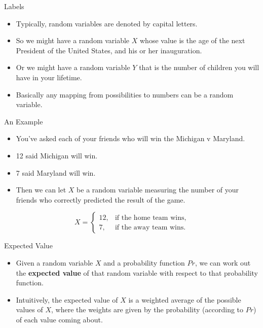 \documentclass[
  ignorenonframetext,
]{beamer}
\providecommand{\tightlist}{%
  \setlength{\itemsep}{0pt}\setlength{\parskip}{0pt}}
\renewcommand{\,}{\text{, }}
\begin{document}
\begin{frame}{Labels}
\protect\hypertarget{labels}{}

\begin{itemize}
\tightlist
\item
  Typically, random variables are denoted by capital letters.
\item
  So we might have a random variable \(X\) whose value is the age of the
  next President of the United States, and his or her inauguration.
\item
  Or we might have a random variable \(Y\) that is the number of
  children you will have in your lifetime.
\item
  Basically any mapping from possibilities to numbers can be a random
  variable.
\end{itemize}

\end{frame}

\begin{frame}{An Example}
\protect\hypertarget{an-example-1}{}

\begin{itemize}
\tightlist
\item
  You've asked each of your friends who will win the Michigan v
  Maryland.
\item
  12 said Michigan will win.
\item
  7 said Maryland will win. \pause 
\item
  Then we can let \(X\) be a random variable measuring the number of
  your friends who correctly predicted the result of the game.
\end{itemize}

\begin{equation*}
X = 
    \begin{cases}
        12,& \text{if the home team wins} ,\\ 
        7,& \text{if the away team wins} .
    \end{cases}
\end{equation*}

\end{frame}

\begin{frame}{Expected Value}
\protect\hypertarget{expected-value}{}

\begin{itemize}
\tightlist
\item
  Given a random variable \(X\) and a probability function \(Pr\), we
  can work out the \textbf{expected value} of that random variable with
  respect to that probability function.
\item
  Intuitively, the expected value of \(X\) is a weighted average of the
  possible values of \(X\), where the weights are given by the
  probability (according to \(Pr\)) of each value coming about.
\end{itemize}

\end{frame}
\end{document}
